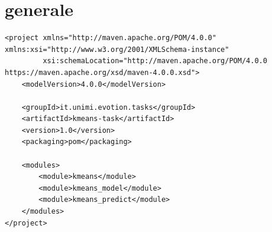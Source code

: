 \documentclass[12pt,a4paper,fleqn,titlepage]{report}
\newcommand\blankpage{
    \clearpage
    \null
    \thispagestyle{empty}
    \clearpage
}
\begin{document}
\blankpage

\printglossaries

\begingroup
\setlength{\emergencystretch}{.5em}
\printbibliography[heading=bibintoc]
\endgroup

\blankpage

\appendix
\chapter{ generale}\label{apx:general_pom}
\begin{lstlisting}
<project xmlns="http://maven.apache.org/POM/4.0.0" xmlns:xsi="http://www.w3.org/2001/XMLSchema-instance"
         xsi:schemaLocation="http://maven.apache.org/POM/4.0.0 https://maven.apache.org/xsd/maven-4.0.0.xsd">
    <modelVersion>4.0.0</modelVersion>

    <groupId>it.unimi.evotion.tasks</groupId>
    <artifactId>kmeans-task</artifactId>
    <version>1.0</version>
    <packaging>pom</packaging>

    <modules>
        <module>kmeans</module>
        <module>kmeans_model</module>
        <module>kmeans_predict</module>
    </modules>
</project>
\end{lstlisting}
\end{document}
